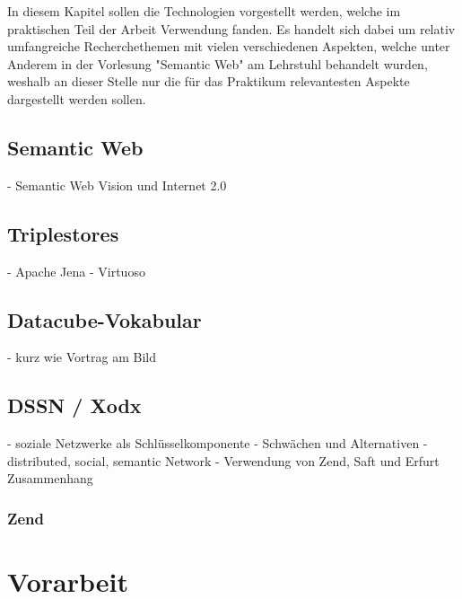 \documentclass{article}
\begin{document}
In diesem Kapitel sollen die Technologien vorgestellt werden, welche im praktischen Teil der Arbeit Verwendung fanden. Es handelt sich dabei um relativ umfangreiche Recherchethemen mit vielen verschiedenen Aspekten, welche unter Anderem in der Vorlesung "Semantic Web" am Lehrstuhl behandelt wurden, weshalb an dieser Stelle nur die für das Praktikum relevantesten Aspekte dargestellt werden sollen.


\subsection{Semantic Web}

- Semantic Web Vision und Internet 2.0


\subsection{Triplestores}

- Apache Jena
- Virtuoso

\subsection{Datacube-Vokabular}

- kurz wie Vortrag am Bild

\subsection{DSSN / Xodx}

- soziale Netzwerke als Schlüsselkomponente
- Schwächen und Alternativen
- distributed, social, semantic Network
- Verwendung von Zend, Saft und Erfurt Zusammenhang

\subsubsection{Zend}

\section{Vorarbeit}
\end{document}
